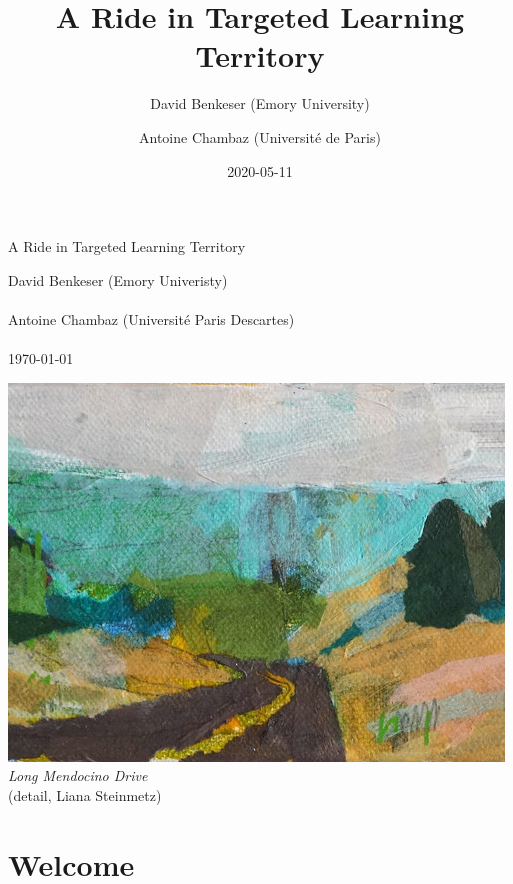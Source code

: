 \documentclass[11pt,openright,twoside]{book}
\title{A Ride in Targeted Learning Territory}
\author{David Benkeser (Emory University) \and Antoine Chambaz (Université de Paris)}
\date{2020-05-11}
\theoremstyle{definition}
\theoremstyle{definition}
\theoremstyle{definition}
\theoremstyle{remark}
\begin{document}
\maketitle

\begin{titlepage}
  \centering
  \vspace*{3cm}
  \begin{Huge}
    {\color{WildStrawberry}{\hrule}}
    \vspace{1cm}
    A Ride in Targeted Learning Territory
    \vspace{1cm}
    {\color{WildStrawberry}{\hrule}}
  \end{Huge}
  \vspace*{1cm}  
  \begin{large}
    David Benkeser (Emory Univeristy)\\~\\
    Antoine Chambaz (Universit\'e Paris Descartes)\\~\\
    \today\par
  \end{large}
  \vspace*{1cm}
  \includegraphics{cover.jpg}\\
  \textit{Long Mendocino Drive}\\
  (detail, Liana Steinmetz)
\end{titlepage}




{
\setcounter{tocdepth}{1}
\tableofcontents
}
\hypertarget{welcome}{%
\chapter*{Welcome}\label{welcome}}
\end{document}
